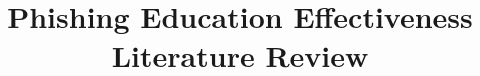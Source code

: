 \documentclass{article}
\begin{document}
\title{Phishing Education Effectiveness Literature Review} \nocite{*}
\maketitle

\printbibliography
\end{document}
